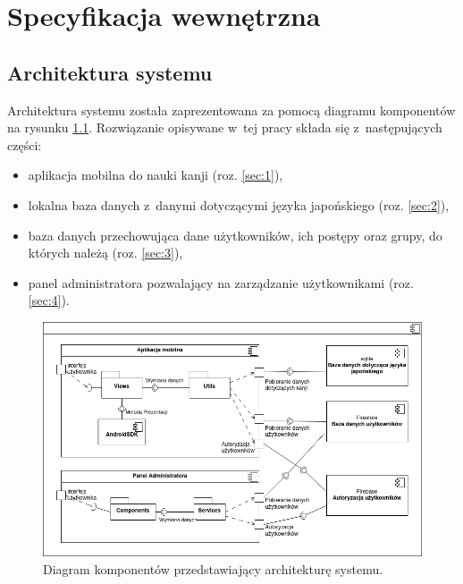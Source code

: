 \documentclass[a4paper,twoside,12pt]{book}
\begin{document}
\chapter{Specyfikacja wewnętrzna}
\label{ch:05}


\section{Architektura systemu}

Architektura systemu została zaprezentowana za pomocą diagramu komponentów na rysunku \ref{fig:archi}. Rozwiązanie opisywane w~tej pracy składa się z~następujących części:
\begin{itemize}
\item aplikacja mobilna do nauki kanji (roz. \ref{sec:1}),
\item lokalna baza danych z~danymi dotyczącymi języka japońskiego (roz. \ref{sec:2}),
\item baza danych przechowująca dane użytkowników, ich postępy oraz grupy, do których należą (roz. \ref{sec:3}),
\item panel administratora pozwalający na zarządzanie użytkownikami (roz. \ref{sec:4}).
\end{itemize}

\begin{figure}[]
\centering
\includegraphics[width=\textwidth]{component}
\caption{Diagram komponentów przedstawiający architekturę systemu.}
\label{fig:archi}
\end{figure}
\end{document}

